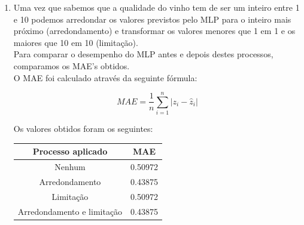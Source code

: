 \documentclass[a4paper,12pt]{article} %
\begin{document}
\begin{enumerate}
\begin{lstlisting}[language=Python]
# Training Test Split
variables_train, variables_test, target_train, target_test= train_test_split(variables, target, 
                                                                            train_size=0.8, random_state=0)

######### Exercise 1 ##########

residues = np.array([])

for i in range(1, 11):
    # Learn the MLP regressor 
    mlp = MLPRegressor(hidden_layer_sizes=(10,10), activation='relu', early_stopping=True, validation_fraction=0.2, random_state=i)
    #Predict output
    y_pred = mlp.fit(variables_train,target_train).predict(variables_test)
    #Calculate residues
    residue = abs(target_test - y_pred)
    residue = residue.to_numpy()
    residues = np.append(residues, residue)
    

#Plot all the residues
plt.hist(residues, edgecolor='black',bins='auto')
plt.title('Histogram of the residues')
plt.xlabel('Residues')
plt.ylabel('Frequency')
plt.savefig('ex1_histogram.png')
plt.show()
    
\end{lstlisting}

\item Uma vez que sabemos que a qualidade do vinho tem de ser um inteiro entre 
1 e 10 podemos arredondar os valores previstos pelo MLP para o inteiro mais próximo (arredondamento)
e transformar os valores menores que 1 em 1 e os maiores que 10 em 10 (limitação).\\
Para comparar o desempenho do MLP antes e depois destes processos, comparamos os MAE's obtidos. 
\\ O MAE foi calculado através da seguinte fórmula:

\begin{equation}
    MAE = \frac{1}{n} \sum_{i=1}^{n} | z_i - \hat{z}_i |
\end{equation}

Os valores obtidos foram os seguintes:

\begin{table}[H]
\centering
\begin{tabular}{|c|c|}
\hline
Processo aplicado & MAE \\ \hline
Nenhum & 0.50972 \\ \hline
Arredondamento & 0.43875 \\ \hline
Limitação & 0.50972 \\ \hline
Arredondamento e limitação & 0.43875 \\ \hline
\end{tabular}
\end{table}


\end{enumerate}
\end{document}

